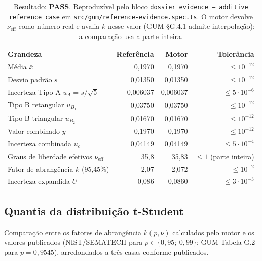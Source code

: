 \documentclass[11pt,a4paper]{article}
\begin{document}
\begin{table}[H]
  \centering
  \small
  \begin{tabularx}{\textwidth}{X r r r}
    \toprule
    \textbf{Grandeza} & \textbf{Referência} & \textbf{Motor} & \textbf{Tolerância} \\
    \midrule
    Média \(\bar{x}\)                                   & 0,1970     & 0,1970     & \(\leq 10^{-12}\) \\
    Desvio padrão \(s\)                                 & 0,01350    & 0,01350    & \(\leq 10^{-12}\) \\
    Incerteza Tipo A \(u_A = s/\sqrt{5}\)               & 0,006037   & 0,006037   & \(\leq 5 \cdot 10^{-6}\) \\
    Tipo B retangular \(u_{B_1}\)                       & 0,03750    & 0,03750    & \(\leq 10^{-12}\) \\
    Tipo B triangular \(u_{B_2}\)                       & 0,01670    & 0,01670    & \(\leq 10^{-12}\) \\
    Valor combinado \(y\)                               & 0,1970     & 0,1970     & \(\leq 10^{-12}\) \\
    Incerteza combinada \(u_c\)                         & 0,04149    & 0,04149    & \(\leq 5 \cdot 10^{-4}\) \\
    Graus de liberdade efetivos \(\nu_\text{eff}\)      & 35,8       & 35,83      & \(\leq 1\) (parte inteira) \\
    Fator de abrangência \(k\) (95,45\%)                & 2,07       & 2,072      & \(\leq 10^{-2}\) \\
    Incerteza expandida \(U\)                           & 0,086      & 0,0860     & \(\leq 3 \cdot 10^{-3}\) \\
    \bottomrule
  \end{tabularx}
  \caption*{\small Resultado: \textbf{PASS}. Reproduzível pelo bloco \texttt{dossier evidence --- additive reference case} em \texttt{src/gum/reference-evidence.spec.ts}. O motor devolve \(\nu_{\text{eff}}\) como número real e avalia \(k\) nesse valor (GUM §G.4.1 admite interpolação); a comparação usa a parte inteira.}
\end{table}

\subsection{Quantis da distribuição t-Student}

Comparação entre os fatores de abrangência \(k(p, \nu)\) calculados pelo motor e os valores publicados (NIST/SEMATECH para \(p \in \{0{,}95;\ 0{,}99\}\); GUM Tabela G.2 para \(p = 0{,}9545\)), arredondados a três casas conforme publicados.
\end{document}
